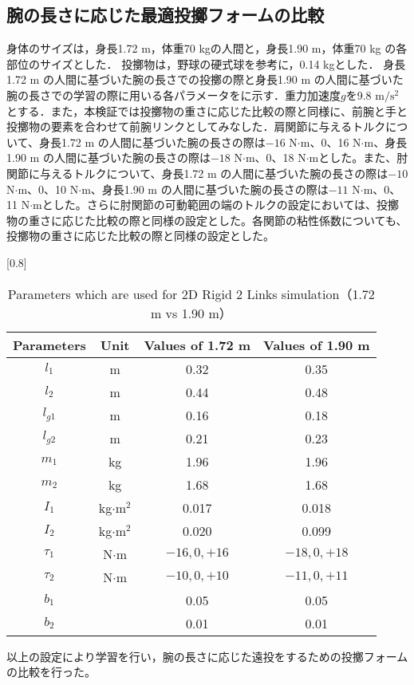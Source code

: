 \begin{small}
\subsection{腕の長さに応じた最適投擲フォームの比較}
身体のサイズは，身長1.72 m，体重70 kgの人間と，身長1.90 m，体重70 kg の各部位のサイズとした．
投擲物は，野球の硬式球を参考に，0.14 kgとした．
身長1.72 m の人間に基づいた腕の長さでの投擲の際と身長1.90 m の人間に基づいた腕の長さでの学習の際に用いる各パラメータをに示す．重力加速度$g$を9.8 $\mathrm{m/s^{2}}$とする．また，本検証では投擲物の重さに応じた比較の際と同様に、前腕と手と投擲物の要素を合わせて前腕リンクとしてみなした．肩関節に与えるトルクについて、身長1.72 m の人間に基づいた腕の長さの際は$-16$ N$\cdot$m、0、16 N$\cdot$m、身長1.90 m の人間に基づいた腕の長さの際は$-18$ N$\cdot$m、0、18 N$\cdot$mとした。また、肘関節に与えるトルクについて、身長1.72 m の人間に基づいた腕の長さの際は$-10$ N$\cdot$m、0、10 N$\cdot$m、身長1.90 m の人間に基づいた腕の長さの際は$-11$ N$\cdot$m、0、11 N$\cdot$mとした。さらに肘関節の可動範囲の端のトルクの設定においては、投擲物の重さに応じた比較の際と同様の設定とした。各関節の粘性係数についても、投擲物の重さに応じた比較の際と同様の設定とした。
\begin{table}[tb]
  \begin{center}
    \caption{Parameters which are used for 2D Rigid 2 Links simulation（1.72 m vs 1.90 m）}
    \scalebox{0.8}[0.8]{
    \begin{tabular}{c|c|c|c}
      \hline
      Parameters & Unit & Values of 1.72 m & Values of 1.90 m \\
      \hline
      $l_{1}$ & m & 0.32 & 0.35 \\
      $l_{2}$ & m & 0.44 & 0.48 \\
      $l_{g1}$ & m & 0.16 & 0.18 \\
      $l_{g2}$ & m & 0.21 & 0.23 \\
      $m_{1}$ & kg & 1.96 & 1.96\\
      $m_{2}$ & kg & 1.68 & 1.68\\
      $I_{1}$ & kg$\cdot$$\mathrm{m}^2$ & 0.017 & 0.018 \\
      $I_{2}$ & kg$\cdot$$\mathrm{m}^2$ & 0.020 & 0.099 \\
      $\tau_{1}$ & N$\cdot$m & $-16, 0, +16$ & $-18, 0, +18$ \\
      $\tau_{2}$ & N$\cdot$m & $-10, 0, +10$ & $-11, 0, +11$ \\
      $b_{1}$ &  & 0.05 & 0.05\\
      $b_{2}$ &  & 0.01 & 0.01\\
      \hline
    \end{tabular}
    }
  \end{center}
\end{table}
以上の設定により学習を行い，腕の長さに応じた遠投をするための投擲フォームの比較を行った。

\end{small}
